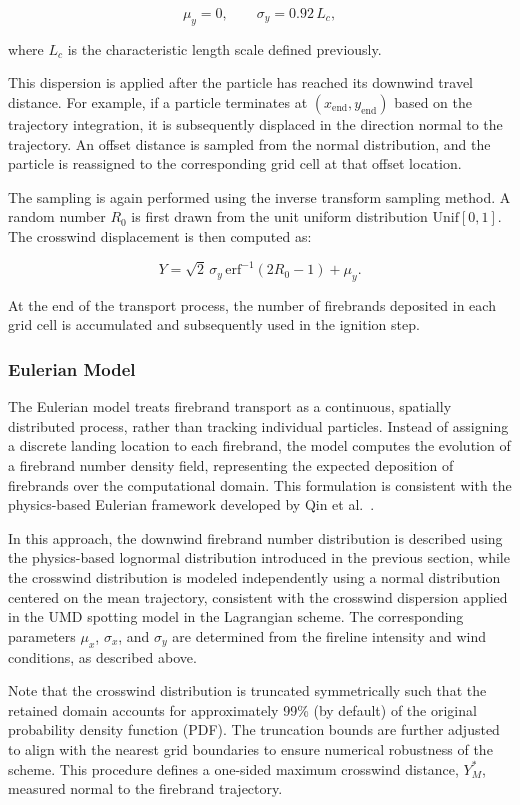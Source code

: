 \[
\mu_y = 0, 
\qquad 
\sigma_y = 0.92 \, L_c,
\]

where $L_c$ is the characteristic length scale defined previously.

This dispersion is applied after the particle has reached its downwind travel distance. For example, if a particle terminates at $(x_{\mathrm{end}}, y_{\mathrm{end}})$ based on the trajectory integration, it is subsequently displaced in the direction normal to the trajectory. An offset distance is sampled from the normal distribution, and the particle is reassigned to the corresponding grid cell at that offset location.

The sampling is again performed using the inverse transform sampling method. A random number $R_0$ is first drawn from the unit uniform distribution $\text{Unif}[0,1]$. The crosswind displacement is then computed as:

\[
Y = \sqrt{2}\,\sigma_y \,\text{erf}^{-1}(2R_0 - 1) + \mu_y.
\]

At the end of the transport process, the number of firebrands deposited in each grid cell is accumulated and subsequently used in the ignition step.

\subsubsection{Eulerian Model}

The Eulerian model treats firebrand transport as a continuous, spatially distributed process, rather than tracking individual particles. Instead of assigning a discrete landing location to each firebrand, the model computes the evolution of a firebrand number density field, representing the expected deposition of firebrands over the computational domain. This formulation is consistent with the physics-based Eulerian framework developed by Qin et al.~\cite{qinPhysicsBasedEulerianFramework2025}.

In this approach, the downwind firebrand number distribution is described using the physics-based lognormal distribution introduced in the previous section, while the crosswind distribution is modeled independently using a normal distribution centered on the mean trajectory, consistent with the crosswind dispersion applied in the UMD spotting model in the Lagrangian scheme. The corresponding parameters $\mu_x$, $\sigma_x$, and $\sigma_y$ are determined from the fireline intensity and wind conditions, as described above.

Note that the crosswind distribution is truncated symmetrically such that the retained domain accounts for approximately 99\% (by default) of the original probability density function (PDF). The truncation bounds are further adjusted to align with the nearest grid boundaries to ensure numerical robustness of the scheme. This procedure defines a one-sided maximum crosswind distance, $Y_M^*$, measured normal to the firebrand trajectory.

